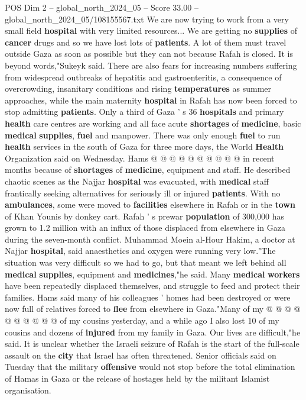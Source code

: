 \begin{textsample}{POS Dim 2 – global\_north\_2024\_05 – Score 33.00 – global\_north\_2024\_05/108155567.txt}
We are now trying to work from a very small field \textbf{hospital} with very limited resources...
We are getting no \textbf{supplies} of \textbf{cancer} drugs and so we have lost lots of \textbf{patients}.
A lot of them must travel outside Gaza as soon as possible but they can not because Rafah is closed.
It is beyond words,"Sukeyk said.
There are also fears for increasing numbers suffering from widespread outbreaks of hepatitis and gastroenteritis, a consequence of overcrowding, insanitary conditions and rising \textbf{temperatures} as summer approaches, while the main maternity \textbf{hospital} in Rafah has now been forced to stop admitting \textbf{patients}.
Only a third of Gaza ' s 36 \textbf{hospitals} and primary \textbf{health} care centres are working and all face acute \textbf{shortages} of \textbf{medicine}, basic \textbf{medical} \textbf{supplies}, \textbf{fuel} and manpower.
There was only enough \textbf{fuel} to run \textbf{health} services in the south of Gaza for three more days, the World \textbf{Health} Organization said on Wednesday.
Hams @ @ @ @ @ @ @ @ @ @ in recent months because of \textbf{shortages} of \textbf{medicine}, equipment and staff.
He described chaotic scenes as the Najjar \textbf{hospital} was evacuated, with \textbf{medical} staff frantically seeking alternatives for seriously ill or injured \textbf{patients}.
With no \textbf{ambulances}, some were moved to \textbf{facilities} elsewhere in Rafah or in the \textbf{town} of Khan Younis by donkey cart.
Rafah ' s prewar \textbf{population} of 300,000 has grown to 1.2 million with an influx of those displaced from elsewhere in Gaza during the seven-month conflict.
Muhammad Moein al-Hour Hakim, a doctor at Najjar \textbf{hospital}, said anaesthetics and oxygen were running very low."The situation was very difficult so we had to go, but that meant we left behind all \textbf{medical} \textbf{supplies}, equipment and \textbf{medicines},"he said.
Many \textbf{medical} \textbf{workers} have been repeatedly displaced themselves, and struggle to feed and protect their families.
Hams said many of his colleagues ' homes had been destroyed or were now full of relatives forced to \textbf{flee} from elsewhere in Gaza."Many of my @ @ @ @ @ @ @ @ @ @ of my cousins yesterday, and a while ago I also lost 10 of my cousins and dozens of \textbf{injured} from my family in Gaza.
Our lives are difficult,"he said.
It is unclear whether the Israeli seizure of Rafah is the start of the full-scale assault on the \textbf{city} that Israel has often threatened.
Senior officials said on Tuesday that the military \textbf{offensive} would not stop before the total elimination of Hamas in Gaza or the release of hostages held by the militant Islamist organisation.

\end{textsample}
